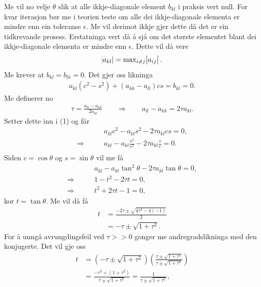 \documentclass[11pt, a4paper]{article}
\begin{document}
    Me vil no velje $\theta$ slik at alle ikkje-diagonale element $b_{kl}$ i praksis vert null. For kvar iterasjon bør me i teorien teste om alle
    dei ikkje-diagonale elementa er mindre enn ein toleranse $\epsilon$. Me vil derimot ikkje gjer dette då det er ein tidkrevande prosess. 
    Erstatninga vert då å sjå om det største elementet blant dei ikkje-diagonale elementa er mindre enn $\epsilon$. Dette vil då vere
    \begin{align*}
      \abs{a_{kl}} = \text{max}_{i \ne j}\abs{a_{ij}}.
    \end{align*}
    Me krever at $b_{kl} = b_{lk} = 0$. Det gjer oss likninga
    \begin{align}
      a_{kl}(c^2 - s^2) + (a_{kk} - a_{ll})cs = b_{kl} = 0.
    \end{align}
    Me definerer no 
    \begin{align*}
      \tau = \frac{a_{ll} - a_{kk}}{2a_{kl}} \qquad \Rightarrow \qquad a_{ll} - a_{kk} = 2\tau a_{kl}.
    \end{align*}
    Setter dette inn i (1) og får
    \begin{align*}
      &a_{kl}c^2 - a_{kl}s^2 - 2\tau a_{kl}cs = 0, \\
      \Rightarrow \qquad &a_{kl} - a_{kl}\frac{s^2}{c^2} - 2\tau a_{kl}\frac{s}{c} = 0. \\
    \end{align*}
    Siden $c = \cos{\theta}$ og $s = \sin{\theta}$ vil me få 
    \begin{align*}
      &a_{kl} - a_{kl}\tan^2{\theta} - 2\tau a_{kl} \tan{\theta} = 0, \\
      \Rightarrow \qquad &1 - t^2 - 2\tau t = 0, \\
      \Rightarrow \qquad &t^2 + 2\tau t - 1 = 0,
    \end{align*}
    kor $t = \tan{\theta}$. Me vil då få 
    \begin{align*}
      t &= \frac{-2\tau \pm \sqrt{4\tau^2 - 4(-1)}}{2} \\
      &= -\tau \pm \sqrt{1 + \tau^2}.
    \end{align*}
    For å unngå avrungdingsfeil ved $\tau >> 0$ gonger me andregradslikninga med den konjugerte. Det vil gje oss
    \begin{align*}
      t &= \left( -\tau \pm \sqrt{1 + \tau^2} \right)\left( \frac{\tau \pm \sqrt{1 + \tau^2}}{\tau \pm \sqrt{1 + \tau^2}} \right) \\
      &= \frac{-\tau^2 + (1 + \tau^2)}{\tau \pm \sqrt{1 + \tau^2}} = \frac{1}{\tau \pm \sqrt{1 + \tau^2}},
    \end{align*}
\end{document}
